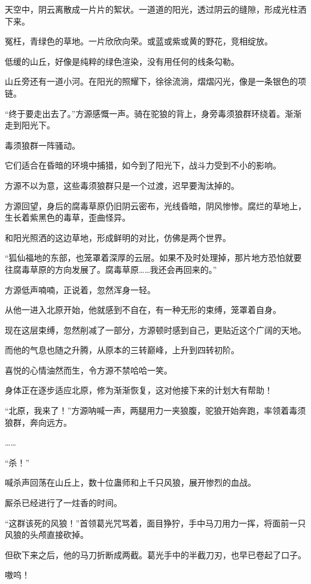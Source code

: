 \begin{this_body}
天空中，阴云离散成一片片的絮状。一道道的阳光，透过阴云的缝隙，形成光柱洒下来。

冤枉，青绿色的草地。一片欣欣向荣。或蓝或紫或黄的野花，竞相绽放。

低缓的山丘，好像是纯粹的绿色渲染，没有用任何的线条勾勒。

山丘旁还有一道小河。在阳光的照耀下，徐徐流淌，熠熠闪光，像是一条银色的项链。

“终于要走出去了。”方源感慨一声。骑在驼狼的背上，身旁毒须狼群环绕着。渐渐走到阳光下。

毒须狼群一阵骚动。

它们适合在昏暗的环境中捕猎，如今到了阳光下，战斗力受到不小的影响。

方源不以为意，这些毒须狼群只是一个过渡，迟早要淘汰掉的。

方源回望，身后的腐毒草原仍旧阴云密布，光线昏暗，阴风惨惨。腐烂的草地上，生长着紫黑色的毒草，歪曲怪异。

和阳光照洒的这边草地，形成鲜明的对比，仿佛是两个世界。

“狐仙福地的东部，也笼罩着深厚的云层。如果不及时处理掉，那片地方恐怕就要往腐毒草原的方向发展了。腐毒草原……我还会再回来的。”

方源低声喃喃，正说着，忽然浑身一轻。

从他一进入北原开始，他就感到不自在，有一种无形的束缚，笼罩着自身。

现在这层束缚，忽然削减了一部分，方源顿时感到自己，更贴近这个广阔的天地。

而他的气息也随之升腾，从原本的三转巅峰，上升到四转初阶。

喜悦的心情油然而生，令方源不禁哈哈一笑。

身体正在逐步适应北原，修为渐渐恢复，这对他接下来的计划大有帮助！

“北原，我来了！”方源呐喊一声，两腿用力一夹狼腹，驼狼开始奔跑，率领着毒须狼群，奔向远方。

……

“杀！”

喊杀声回荡在山丘上，数十位蛊师和上千只风狼，展开惨烈的血战。

厮杀已经进行了一炷香的时间。

“这群该死的风狼！”首领葛光咒骂着，面目狰狞，手中马刀用力一挥，将面前一只风狼的头颅直接砍掉。

但砍下来之后，他的马刀折断成两截。葛光手中的半截刀刃，也早已卷起了口子。

嗷呜！


\end{this_body}
